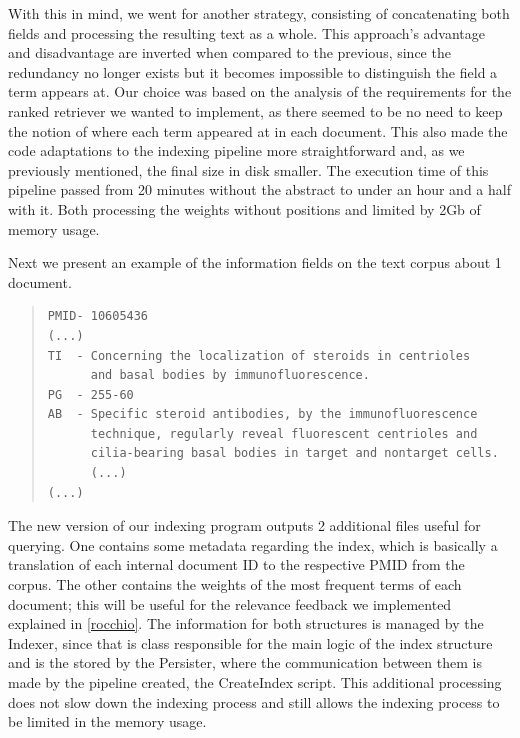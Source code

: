 \documentclass[12pt]{article}
\begin{document}
With this in mind, we went for another strategy, consisting of concatenating 
both fields and processing the resulting text as a whole.
This approach's advantage and disadvantage are inverted when compared to the 
previous, since the redundancy no longer exists but it becomes impossible to
distinguish the field a term appears at.
Our choice was based on the analysis of the requirements for the ranked retriever
we wanted to implement, as there seemed to be no need to keep the notion of where
each term appeared at in each document.
This also made the code adaptations to the indexing pipeline more straightforward 
and, as we previously mentioned, the final size in disk smaller.
The execution time of this pipeline passed from 20 minutes without the abstract to under an hour and a 
half with it. Both processing the weights without positions and limited by 2Gb of memory usage.

Next we present an example of the information fields on the text corpus about 1 document.

\begingroup
\addtolength\leftmargini{-0.4in}
\addtolength\baselineskip{-0.05in}
\begin{quote}
\begin{verbatim}
PMID- 10605436
(...)
TI  - Concerning the localization of steroids in centrioles
      and basal bodies by immunofluorescence.
PG  - 255-60
AB  - Specific steroid antibodies, by the immunofluorescence 
      technique, regularly reveal fluorescent centrioles and 
      cilia-bearing basal bodies in target and nontarget cells. 
      (...)
(...)
\end{verbatim}
\end{quote}
\endgroup
\vspace{-10pt}

The new version of our indexing program outputs 2 additional files useful for 
querying.
One contains some metadata regarding the index, which is basically a 
translation of each internal document ID to the respective PMID from the corpus.
The other contains the weights of the most frequent terms of each document; this
will be useful for the relevance feedback we implemented explained in \ref{rocchio}.
The information for both structures is managed by the Indexer, since that is class responsible for the main logic of the index structure and is the stored by the Persister, where the communication between them is made by the pipeline created, the CreateIndex script. This additional processing does not slow down the indexing process and still allows the indexing process to be limited in the memory usage.  
\end{document}
